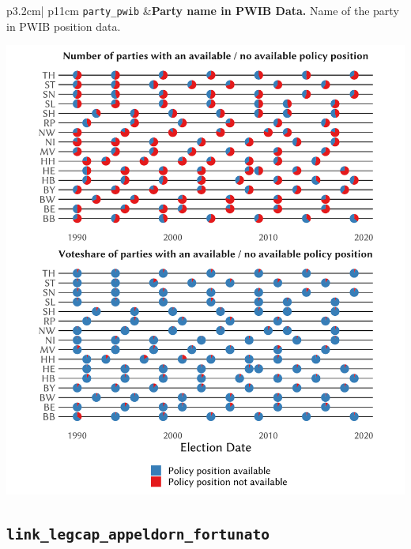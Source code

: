\documentclass[
]{scrartcl}
\begin{document}
\begin{longtable}{p{3.2cm}| p{11cm}}
\texttt{party\_pwib} &\textbf{Party name in PWIB Data.}\newline 
Name of the party in PWIB position data.








\hspace*{.25cm}
\begin{minipage}[t]{\linewidth }
\vspace{0pt}
\includegraphics[width = \linewidth]{cbfiles/pwibplot.pdf}
\end{minipage}







\end{longtable}

\newpage

\hypertarget{link_legcap_appeldorn_fortunato}{%
\subsection{\texorpdfstring{\texttt{link\_legcap\_appeldorn\_fortunato}}{link\_legcap\_appeldorn\_fortunato}}\label{link_legcap_appeldorn_fortunato}}
\end{document}
